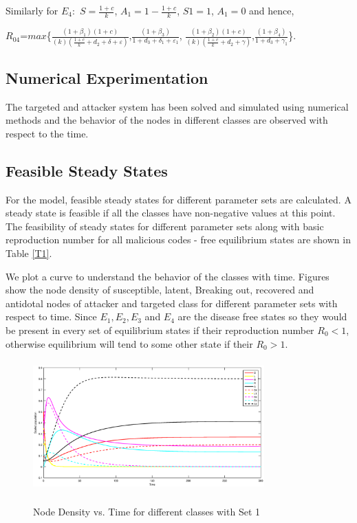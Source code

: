 \documentclass[conference]{IEEEtran}
\begin{document}
\noindent Similarly for $E_4:$ $S=\frac{1+c}{k}$, $A_1=1-\frac{1+c}{k}$, $S1=1$, $A_1=0$ and hence,

$R_{04}$=$max$\{$\frac{(1+{\beta}_1)(1+c)}{(k)(\frac{1+c}{k}+d_2+\delta+\varepsilon)}$,$\frac{(1+{\beta}_3)}{1+d_3+{\delta}_1+{\varepsilon}_1}$,
$\frac{(1+{\beta}_2)(1+c)}{(k)(\frac{1+c}{k}+d_2+\gamma)}$,$\frac{(1+{\beta}_4)}{1+d_3+{\gamma}_1}$\}.\\

\normalfont
\subsection{Numerical Experimentation}
The targeted and attacker system has been solved and simulated using numerical methods and the behavior of the nodes in different classes are observed with respect to the time.
\subsection{Feasible Steady States}
For the model, feasible steady states for different parameter sets are calculated. A steady state is feasible if all the classes have non-negative values at this point. The feasibility of steady states for different parameter sets along with basic reproduction number for all malicious codes - free equilibrium states are shown in Table \ref{T1}.

\indent We plot a curve to understand the behavior of the classes with time. Figures show the node density of susceptible, latent, Breaking out, recovered and antidotal nodes of attacker and targeted class for different parameter sets with respect to time. Since $E_{1}, E_{2},E_{3}$ and $E_{4}$ are the disease free states so they would be present in every set of equilibrium states if their reproduction number $R_{0}<1$, otherwise equilibrium will tend to some other state if their $R_{0}>1$.

\begin{figure}
\centering
  \includegraphics[width=3.5in,height=2.0in]{1.eps}\\
  \caption{Node Density vs. Time for different classes with Set 1}\label{fig:ff0}
\end{figure}
\end{document}
